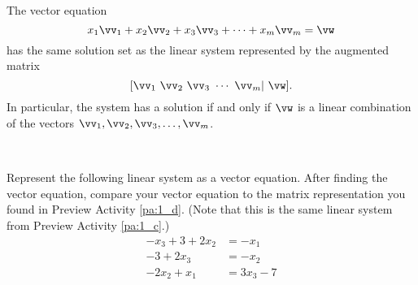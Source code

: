 \begin{theorem}
The vector equation
\[x_1 \vv_1 + x_2\vv_2 + x_3\vv_3 + \cdots + x_m\vv_m = \vw\]
has the same solution set as the linear system represented by the augmented matrix
\[[\vv_1 \  \vv_2 \  \vv_3 \ \cdots \ \vv_m | \ \vw].\]
In particular, the system has a solution if and only if $\vw$ is a linear combination of the vectors $\vv_1, \vv_2, \vv_3, \ldots, \vv_m$.
\end{theorem}

\begin{activity} \label{act:A1.3_8} ~
	\ba
	\item Represent the following linear system as a vector equation. After finding the vector equation, compare your vector equation to the matrix representation you found in Preview Activity \ref{pa:1_d}. (Note that this is the same linear system from Preview Activity \ref{pa:1_c}.) 
\begin{equation*}
\begin{split}
-x_3 + 3 + 2x_2&= -x_1   \\
-3 + 2x_3 &= -x_2  \\
-2x_2 + x_1 &= 3x_3-7 
\end{split} 
\end{equation*} 

\begin{comment}
The resulting vector equation is
\[x_1 \left[ \begin{array}{r} 1 \\0 \\-1 \end{array} \right] +x_2 \left[ \begin{array}{r} 2 \\ 1\\ -2 \end{array} \right] + x_3 \left[ \begin{array}{r} -1 \\ 2 \\ -3 \end{array} \right] = \left[ \begin{array}{r} -3 \\ 3\\ -7\end{array} \right]  \]
The vectors are the columns of the augmented matrix representation.


\end{comment}


\end{activity}
